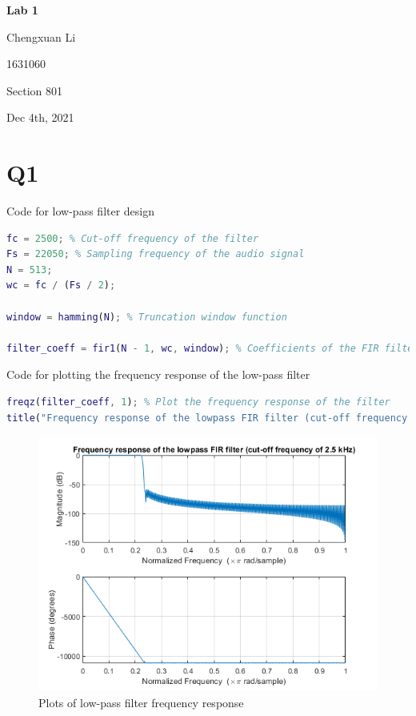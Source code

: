 \documentclass{article}
\begin{document}
\begin{titlepage}
\begin{center}
\vspace*{1cm}
		
\textbf{Lab 1}
			
\vspace{0.5cm}
Chengxuan Li
			
\vspace{0.1cm}
1631060
			
\vspace{0.1cm}
Section 801
			
\vspace{0.1cm}
Dec 4th, 2021
\end{center}
\end{titlepage}

\section*{Q1}

Code for low-pass filter design
\begin{lstlisting}[language=Matlab]
fc = 2500; % Cut-off frequency of the filter
Fs = 22050; % Sampling frequency of the audio signal
N = 513;
wc = fc / (Fs / 2);

window = hamming(N); % Truncation window function

filter_coeff = fir1(N - 1, wc, window); % Coefficients of the FIR filter
\end{lstlisting}

Code for plotting the frequency response of the low-pass filter
\begin{lstlisting}[language=Matlab]
freqz(filter_coeff, 1); % Plot the frequency response of the filter
title("Frequency response of the lowpass FIR filter (cut-off frequency of 2.5 kHz)");
\end{lstlisting}

\begin{figure}[h!]
\includegraphics[width=\textwidth]{LPF.png}
\caption{Plots of low-pass filter frequency response}
\end{figure}
\end{document}
